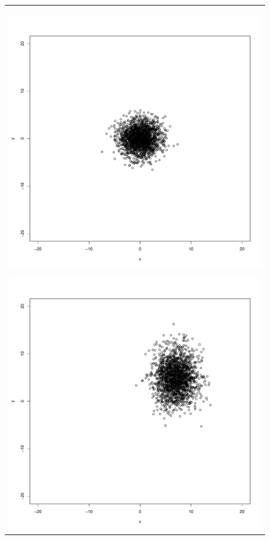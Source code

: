 \documentclass{jsarticle}
\begin{document}
\begin{figure}[b]
\begin{minipage}{0.8\hsize}
\begin{tabular}{c}
\begin{minipage}{0.25\hsize}
				\includegraphics[width=\linewidth]{img/mvrnorm-plot2.pdf}
				\subcaption{第2項の正規分布}
				\label{img:mvrnorm-plot2}
			\end{minipage}
			\begin{minipage}{0.25\hsize}
				\centering
				\includegraphics[width=\linewidth]{img/mvrnorm-plot3.pdf}

\end{minipage}
\end{tabular}
\end{minipage}
\end{figure}
\end{document}
